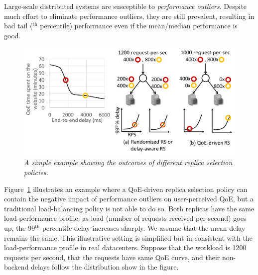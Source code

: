 
Large-scale distributed systems are susceptible to {\em performance outliers}.
Despite much effort to eliminate performance outliers, they are still prevalent, resulting in bad tail ($^\textrm{th}$ percentile) performance even if the mean/median performance is good.


\begin{figure}
	\centering
	\vspace{-0.6cm}
	\includegraphics[width=1\textwidth]{figs/replica.pdf}
	\vspace{-0.9cm}
	\caption{\em A simple example showing the outcomes of different replica selection policies.}
	\label{fig:replica}
\end{figure}
Figure~\ref{fig:replica} illustrates an example where a QoE-driven replica selection policy can contain the negative impact of performance outliers on user-perceived QoE, but a traditional load-balancing policy is not able to do so.
Both replicas have the same load-performance profile: as load (number of requests received per second) goes up, the 99$^\textrm{th}$ percentile delay increases sharply. We assume that the mean delay remains the same. 
This illustrative setting is simplified but in consistent with the load-performance profile in real datacenters.%
Suppose that the workload is 1200 requests per second, that the requests have same QoE curve, and their non-backend delays follow the distribution show in the figure.

